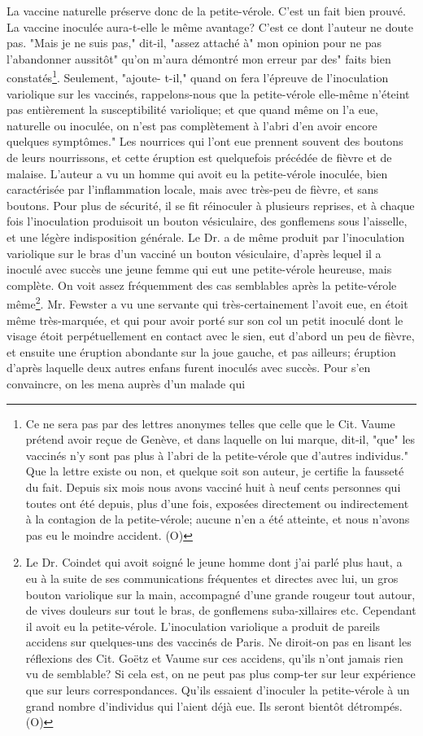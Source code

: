 La vaccine naturelle préserve donc de la petite-vérole. C'est un fait bien prouvé. La vaccine inoculée aura-t-elle le même avantage? C'est ce dont l'auteur ne doute pas. "Mais je ne suis pas," dit-il, "assez attaché à" mon opinion pour ne pas l'abandonner aussitôt" qu'on m'aura démontré mon erreur par des" faits bien constatés\footnote{Ce ne sera pas par des lettres anonymes telles que celle que le Cit. Vaume prétend avoir reçue de Genève, et dans laquelle on lui marque, dit-il, "que" les vaccinés n’y sont pas plus à l’abri de la petite-vérole que d’autres individus." Que la lettre existe ou non, et quelque soit son auteur, je certifie la fausseté du fait. Depuis six mois nous avons vacciné huit à neuf cents personnes qui toutes ont été depuis, plus d’une fois, exposées directement ou indirectement à la contagion de la petite-vérole; aucune n’en a été atteinte, et nous n’avons pas eu le moindre accident. (O)}. Seulement, "ajoute-\setcounter{page}{287} t-il," quand on fera l’épreuve de l’inoculation variolique sur les vaccinés, rappelons-nous que la petite-vérole elle-même n’éteint pas entièrement la susceptibilité variolique; et que quand même on l’a eue, naturelle ou inoculée, on n’est pas complètement à l’abri d’en avoir encore quelques symptômes." Les nourrices qui l’ont eue prennent souvent des boutons de leurs nourrissons, et cette éruption est quelquefois précédée de fièvre et de malaise. L’auteur a vu un homme qui avoit eu la petite-vérole inoculée, bien caractérisée par l’inflammation locale, mais avec très-peu de fièvre, et sans boutons. Pour plus de sécurité, il se fit réinoculer à plusieurs reprises, et à chaque fois l’inoculation produisoit un bouton vésiculaire, des gonflemens sous l’aisselle, et une légère indisposition générale. Le Dr. a de même\setcounter{page}{288} produit par l'inoculation variolique sur le bras d'un vacciné un bouton vésiculaire, d'après lequel il a inoculé avec succès une jeune femme qui eut une petite-vérole heureuse, mais complète. On voit assez fréquemment des cas semblables après la petite-vérole même\footnote{Le Dr. Coindet qui avoit soigné le jeune homme dont j'ai parlé plus haut, a eu à la suite de ses communications fréquentes et directes avec lui, un gros bouton variolique sur la main, accompagné d'une grande rougeur tout autour, de vives douleurs sur tout le bras, de gonflemens suba-xillaires etc. Cependant il avoit eu la petite-vérole. L'inoculation variolique a produit de pareils accidens sur quelques-uns des vaccinés de Paris. Ne diroit-on pas en lisant les réflexions des Cit. Goëtz et Vaume sur ces accidens, qu'ils n'ont jamais rien vu de semblable? Si cela est, on ne peut pas plus comp-ter sur leur expérience que sur leurs correspondances. Qu'ils essaient d'inoculer la petite-vérole à un grand nombre d'individus qui l'aient déjà eue. Ils seront bientôt détrompés. (O)}. Mr. Fewster a vu une servante qui très-certainement l'avoit eue, en étoit même très-marquée, et qui pour avoir porté sur son col un petit inoculé dont le visage étoit perpétuellement en contact avec le sien, eut d'abord un peu de fièvre, et ensuite une éruption abondante sur la joue gauche, et pas ailleurs; éruption d'après laquelle deux\setcounter{page}{289} autres enfans furent inoculés avec succès. Pour s'en convaincre, on les mena auprès d'un malade qui 